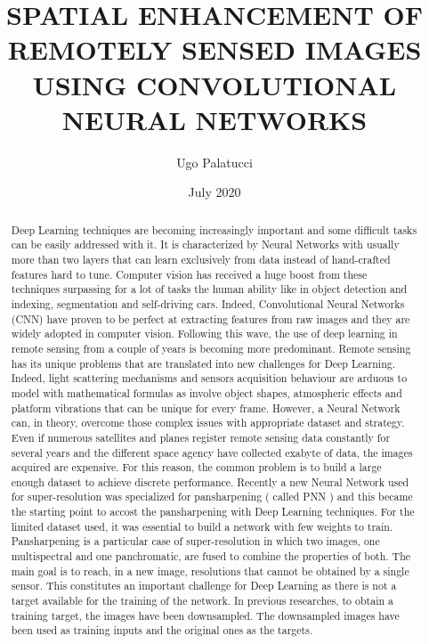 \documentclass[notitlepage, 12pt]{report}
\title{SPATIAL ENHANCEMENT OF REMOTELY SENSED IMAGES USING CONVOLUTIONAL NEURAL NETWORKS}
\author{Ugo Palatucci}
\date{July 2020}
\begin{document}
\maketitle


\begin{abstract}
	Deep Learning techniques are becoming increasingly important and
	some difficult tasks can be easily addressed with it.
	It is characterized by Neural Networks with usually more than two layers that can learn exclusively from data instead of hand-crafted features hard to tune.
	Computer vision has received a huge boost from these techniques surpassing for a lot of tasks the human ability like in object detection and indexing, segmentation and self-driving cars.
	Indeed, Convolutional Neural Networks (CNN) have proven to be perfect at extracting features from raw images and they are widely adopted in computer vision.
	Following this wave, the use of deep learning in remote sensing from a couple of years is becoming more predominant.
	Remote sensing has its unique problems that are translated into new challenges for Deep Learning.
	Indeed, light scattering mechanisms and sensors acquisition behaviour are arduous to model with mathematical formulas as involve object shapes, atmospheric effects and platform vibrations that can be unique for every frame.
	However, a Neural Network can, in theory, overcome those complex issues with appropriate dataset and strategy.
	Even if numerous satellites and planes register remote sensing data constantly for several years and the different space agency have collected exabyte of data, the images acquired are expensive. 
	For this reason, the common problem is to build a large enough dataset to achieve discrete performance.
	Recently a new Neural Network used for super-resolution was specialized for pansharpening ( called PNN ) and this became the starting point to accost the pansharpening with Deep Learning techniques.
	For the limited dataset used, it was essential to build a network with few weights to train. 
	Pansharpening is a particular case of super-resolution in which two images, one multispectral and one panchromatic, are fused to combine the properties of both. 
	The main goal is to reach, in a new image, resolutions that cannot be obtained by a single sensor. This constitutes an important challenge for Deep Learning as there is not a target available for the training of the network.
	In previous researches, to obtain a training target, the images have been downsampled. The downsampled images have been used as training inputs and the original ones as the targets. 

\end{abstract}
\end{document}
